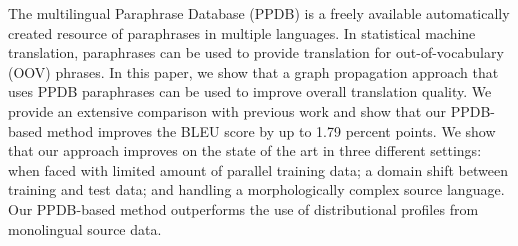 The multilingual Paraphrase Database (PPDB) is a freely available automatically created resource of paraphrases in multiple languages. In statistical machine translation, paraphrases can be used to provide translation for out-of-vocabulary (OOV) phrases. In this paper, we show that a graph propagation approach that uses PPDB paraphrases can be used to improve overall translation quality. We provide an extensive comparison with previous work and show that our PPDB-based method improves the BLEU score by up to 1.79 percent points. We show that our approach improves on the state of the art in three different settings: when faced with limited amount of parallel training data; a domain shift between training and test data; and handling a morphologically complex source language. Our PPDB-based method outperforms the use of distributional profiles from monolingual source data.
